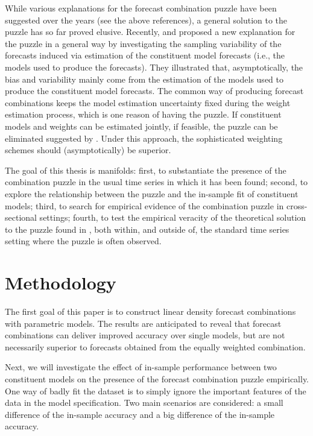 \documentclass{monashthesis}
\begin{document}
While various explanations for the forecast combination puzzle have been suggested over the years (see the above references), a general solution to the puzzle has so far proved elusive. Recently, \textcite{ZMFP22} and \textcite{FZMP23} proposed a new explanation for the puzzle in a general way by investigating the sampling variability of the forecasts induced via estimation of the constituent model forecasts (i.e., the models used to produce the forecasts). They illustrated that, asymptotically, the bias and variability mainly come from the estimation of the models used to produce the constituent model forecasts. The common way of producing forecast combinations keeps the model estimation uncertainty fixed during the weight estimation process, which is one reason of having the puzzle. If constituent models and weights can be estimated jointly, if feasible, the puzzle can be eliminated suggested by \textcite{FZMP23}. Under this approach, the sophisticated weighting schemes should (asymptotically) be superior.

The goal of this thesis is manifolds: first, to substantiate the presence of the combination puzzle in the usual time series in which it has been found; second, to explore the relationship between the puzzle and the in-sample fit of constituent models; third, to search for empirical evidence of the combination puzzle in cross-sectional settings; fourth, to test the empirical veracity of the theoretical solution to the puzzle found in \textcite{FZMP23}, both within, and outside of, the standard time series setting where the puzzle is often observed.

\hypertarget{method}{%
\chapter{Methodology}\label{method}}

The first goal of this paper is to construct linear density forecast combinations with parametric models. The results are anticipated to reveal that forecast combinations can deliver improved accuracy over single models, but are not necessarily superior to forecasts obtained from the equally weighted combination.

Next, we will investigate the effect of in-sample performance between two constituent models on the presence of the forecast combination puzzle empirically. One way of badly fit the dataset is to simply ignore the important features of the data in the model specification. Two main scenarios are considered: a small difference of the in-sample accuracy and a big difference of the in-sample accuracy.
\end{document}
